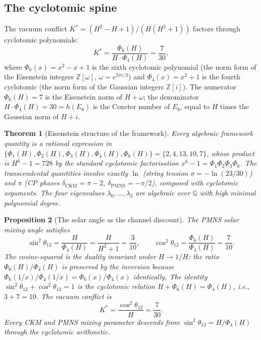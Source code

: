 \documentclass[11pt,a4paper]{article}
\newtheorem{theorem}{Theorem}[section]
\newtheorem{proposition}[theorem]{Proposition}
\theoremstyle{definition}
\theoremstyle{remark}
\newcommand{\Z}{\mathbb{Z}}
\begin{document}
\subsection{The cyclotomic spine}\label{sec:cyclotomic}

The vacuum conflict $K^*=(H^2-H+1)/(H(H^2+1))$ factors through cyclotomic polynomials:
\begin{equation}\label{eq:K_cyclotomic}
K^*=\frac{\Phi_6(H)}{H\cdot\Phi_4(H)}=\frac{7}{30},
\end{equation}
where $\Phi_6(x)=x^2-x+1$ is the sixth cyclotomic polynomial (the norm form of the Eisenstein integers $\Z[\omega]$, $\omega=e^{2\pi i/3}$) and $\Phi_4(x)=x^2+1$ is the fourth cyclotomic (the norm form of the Gaussian integers $\Z[i]$). The numerator $\Phi_6(H)=7$ is the Eisenstein norm of $H+\omega$; the denominator $H\cdot\Phi_4(H)=30=h(E_8)$ is the Coxeter number of $E_8$, equal to $H$ times the Gaussian norm of $H+i$.

\begin{theorem}[Eisenstein structure of the framework]\label{thm:eisenstein}
Every algebraic framework quantity is a rational expression in $\{\Phi_1(H),\Phi_2(H),\Phi_3(H),\Phi_4(H),\Phi_6(H)\}=\{2,4,13,10,7\}$, whose product is $H^6-1=728$ by the standard cyclotomic factorisation $x^6-1=\Phi_1\Phi_2\Phi_3\Phi_6$. The transcendental quantities involve exactly $\ln$ (string tension $\sigma=-\ln(23/30)$) and $\pi$ (CP phases $\delta_{\mathrm{CKM}}=\pi-2$, $\delta_{\mathrm{PMNS}}=-\pi/2$), composed with cyclotomic arguments. The four eigenvalues $\lambda_0,\ldots,\lambda_3$ are algebraic over $\mathbb{Q}$ with high minimal polynomial degree.
\end{theorem}

\begin{proposition}[The solar angle as the channel discount]\label{prop:solar_channel}
The PMNS solar mixing angle satisfies
\begin{equation}\label{eq:solar_channel}
\sin^2\theta_{12}=\frac{H}{\Phi_4(H)}=\frac{H}{H^2+1}=\frac{3}{10},\qquad
\cos^2\theta_{12}=\frac{\Phi_6(H)}{\Phi_4(H)}=\frac{7}{10}.
\end{equation}
The cosine-squared is the duality invariant under $H\to 1/H$: the ratio $\Phi_6(H)/\Phi_4(H)$ is preserved by the inversion because $\Phi_6(1/x)/\Phi_4(1/x)=\Phi_6(x)/\Phi_4(x)$ identically. The identity $\sin^2\theta_{12}+\cos^2\theta_{12}=1$ is the cyclotomic relation $H+\Phi_6(H)=\Phi_4(H)$, i.e., $3+7=10$. The vacuum conflict is
\begin{equation}\label{eq:K_from_solar}
K^*=\frac{\cos^2\theta_{12}}{H}=\frac{7}{30}.
\end{equation}
Every CKM and PMNS mixing parameter descends from $\sin^2\theta_{12}=H/\Phi_4(H)$ through the cyclotomic arithmetic.
\end{proposition}
\end{document}
